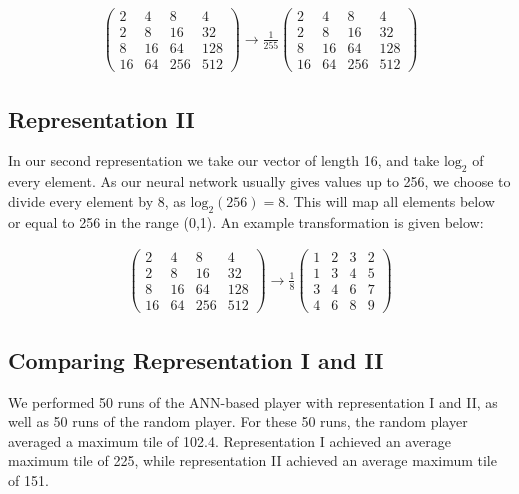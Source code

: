 \documentclass[11pt,a4paper]{article}
\begin{document}
\begin{align*}
\begin{pmatrix}
  2  &  4 &   8 &  4\\
  2  &  8 &  16 & 32 \\
  8  & 16 &  64 & 128 \\
  16 & 64 & 256 & 512
\end{pmatrix}
\rightarrow
\frac{1}{255}
\begin{pmatrix}
  2  &  4 &   8 &  4\\
  2  &  8 &  16 & 32 \\
  8  & 16 &  64 & 128 \\
  16 & 64 & 256 & 512
\end{pmatrix}
\end{align*}

\subsection*{Representation II}
In our second representation we take our vector of length 16, and take $\textrm{log}_2$ of every element. As our neural network usually gives values up to 256, we choose to divide every element by 8, as $\textrm{log}_2(256) = 8$. This will map all elements below or equal to 256 in the range (0,1). An example transformation is given below:

\begin{align*}
\begin{pmatrix}
  2  &  4 &   8 &  4\\
  2  &  8 &  16 & 32 \\
  8  & 16 &  64 & 128 \\
  16 & 64 & 256 & 512
\end{pmatrix}
\rightarrow
\frac{1}{8}
\begin{pmatrix}
  1 & 2 & 3 & 2 \\
  1 & 3 & 4 & 5 \\
  3 & 4 & 6 & 7 \\
  4 & 6 & 8 & 9
\end{pmatrix}
\end{align*}

\subsection*{Comparing Representation I and II}
We performed 50 runs of the ANN-based player with representation I and II, as well as 50 runs of the random player. For these 50 runs, the random player averaged a maximum tile of 102.4. Representation I achieved an average maximum tile of 225, while representation II achieved an average maximum tile of 151.
\end{document}
